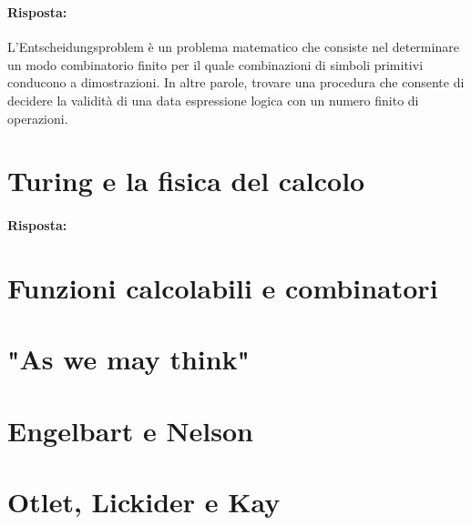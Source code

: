 \subsubsection{}


\paragraph{Risposta:} L'Entscheidungsproblem è un problema matematico che consiste nel determinare
un modo combinatorio finito per il quale combinazioni di simboli primitivi conducono a dimostrazioni.
In altre parole, trovare una procedura che consente di decidere la validità di una data
espressione logica con un numero finito di operazioni.

\section{Turing e la fisica del calcolo}


\paragraph{Risposta:} 

\subsubsection{}

\section{Funzioni calcolabili e combinatori}

\section{"As we may think"}

\section{Engelbart e Nelson}

\section{Otlet, Lickider e Kay}